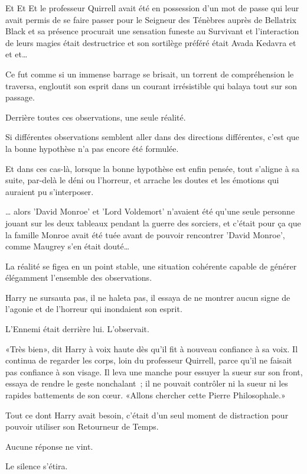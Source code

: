 \later

Et Et Et le professeur Quirrell avait été en possession d'un mot de passe qui leur avait permis de se faire passer pour le Seigneur des Ténèbres auprès de Bellatrix Black et sa présence procurait une sensation funeste au Survivant et l'interaction de leurs magies était destructrice et son sortilège préféré était Avada Kedavra et et et…

Ce fut comme si un immense barrage se brisait, un torrent de compréhension le traversa, engloutit son esprit dans un courant irrésistible qui balaya tout sur son passage.

Derrière toutes ces observations, une seule réalité.

Si différentes observations semblent aller dans des directions différentes, c'est que la bonne hypothèse n'a pas encore été formulée.

Et dans ces cas-là, lorsque la bonne hypothèse est enfin pensée, tout s'aligne à sa suite, par-delà le déni ou l'horreur, et arrache les doutes et les émotions qui auraient pu s'interposer.

… alors 'David Monroe' et 'Lord Voldemort' n'avaient été qu'une seule personne jouant sur les deux tableaux pendant la guerre des sorciers, et c'était pour ça que la famille Monroe avait été tuée avant de pouvoir rencontrer 'David Monroe', comme Maugrey s'en était douté…

La réalité se figea en un point stable, une situation cohérente capable de générer élégamment l'ensemble des observations.

Harry ne sursauta pas, il ne haleta pas, il essaya de ne montrer aucun signe de l'agonie et de l'horreur qui inondaient son esprit.

L'Ennemi était derrière lui. L'observait.

«Très bien», dit Harry à voix haute dès qu'il fit à nouveau confiance à sa voix. Il continua de regarder les corps, loin du professeur Quirrell, parce qu'il ne faisait pas confiance à son visage. Il leva une manche pour essuyer la sueur sur son front, essaya de rendre le geste nonchalant~; il ne pouvait contrôler ni la sueur ni les rapides battements de son cœur. «Allons chercher cette Pierre Philosophale.»

Tout ce dont Harry avait besoin, c'était d'un seul moment de distraction pour pouvoir utiliser son Retourneur de Temps.

Aucune réponse ne vint.

Le silence s'étira.

